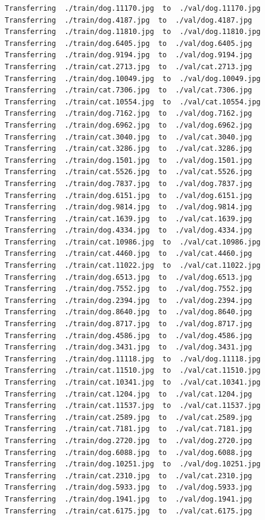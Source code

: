 \documentclass[]{book}
\theoremstyle{definition}
\theoremstyle{definition}
\theoremstyle{definition}
\theoremstyle{remark}
\begin{document}
\begin{verbatim}
Transferring  ./train/dog.11170.jpg  to  ./val/dog.11170.jpg
Transferring  ./train/dog.4187.jpg  to  ./val/dog.4187.jpg
Transferring  ./train/dog.11810.jpg  to  ./val/dog.11810.jpg
Transferring  ./train/dog.6405.jpg  to  ./val/dog.6405.jpg
Transferring  ./train/dog.9194.jpg  to  ./val/dog.9194.jpg
Transferring  ./train/cat.2713.jpg  to  ./val/cat.2713.jpg
Transferring  ./train/dog.10049.jpg  to  ./val/dog.10049.jpg
Transferring  ./train/cat.7306.jpg  to  ./val/cat.7306.jpg
Transferring  ./train/cat.10554.jpg  to  ./val/cat.10554.jpg
Transferring  ./train/dog.7162.jpg  to  ./val/dog.7162.jpg
Transferring  ./train/dog.6962.jpg  to  ./val/dog.6962.jpg
Transferring  ./train/cat.3040.jpg  to  ./val/cat.3040.jpg
Transferring  ./train/cat.3286.jpg  to  ./val/cat.3286.jpg
Transferring  ./train/dog.1501.jpg  to  ./val/dog.1501.jpg
Transferring  ./train/cat.5526.jpg  to  ./val/cat.5526.jpg
Transferring  ./train/dog.7837.jpg  to  ./val/dog.7837.jpg
Transferring  ./train/dog.6151.jpg  to  ./val/dog.6151.jpg
Transferring  ./train/dog.9814.jpg  to  ./val/dog.9814.jpg
Transferring  ./train/cat.1639.jpg  to  ./val/cat.1639.jpg
Transferring  ./train/dog.4334.jpg  to  ./val/dog.4334.jpg
Transferring  ./train/cat.10986.jpg  to  ./val/cat.10986.jpg
Transferring  ./train/cat.4460.jpg  to  ./val/cat.4460.jpg
Transferring  ./train/cat.11022.jpg  to  ./val/cat.11022.jpg
Transferring  ./train/dog.6513.jpg  to  ./val/dog.6513.jpg
Transferring  ./train/dog.7552.jpg  to  ./val/dog.7552.jpg
Transferring  ./train/dog.2394.jpg  to  ./val/dog.2394.jpg
Transferring  ./train/dog.8640.jpg  to  ./val/dog.8640.jpg
Transferring  ./train/dog.8717.jpg  to  ./val/dog.8717.jpg
Transferring  ./train/dog.4586.jpg  to  ./val/dog.4586.jpg
Transferring  ./train/dog.3431.jpg  to  ./val/dog.3431.jpg
Transferring  ./train/dog.11118.jpg  to  ./val/dog.11118.jpg
Transferring  ./train/cat.11510.jpg  to  ./val/cat.11510.jpg
Transferring  ./train/cat.10341.jpg  to  ./val/cat.10341.jpg
Transferring  ./train/cat.1204.jpg  to  ./val/cat.1204.jpg
Transferring  ./train/cat.11537.jpg  to  ./val/cat.11537.jpg
Transferring  ./train/cat.2589.jpg  to  ./val/cat.2589.jpg
Transferring  ./train/cat.7181.jpg  to  ./val/cat.7181.jpg
Transferring  ./train/dog.2720.jpg  to  ./val/dog.2720.jpg
Transferring  ./train/dog.6088.jpg  to  ./val/dog.6088.jpg
Transferring  ./train/dog.10251.jpg  to  ./val/dog.10251.jpg
Transferring  ./train/cat.2310.jpg  to  ./val/cat.2310.jpg
Transferring  ./train/dog.5933.jpg  to  ./val/dog.5933.jpg
Transferring  ./train/dog.1941.jpg  to  ./val/dog.1941.jpg
Transferring  ./train/cat.6175.jpg  to  ./val/cat.6175.jpg

\end{verbatim}
\end{document}
